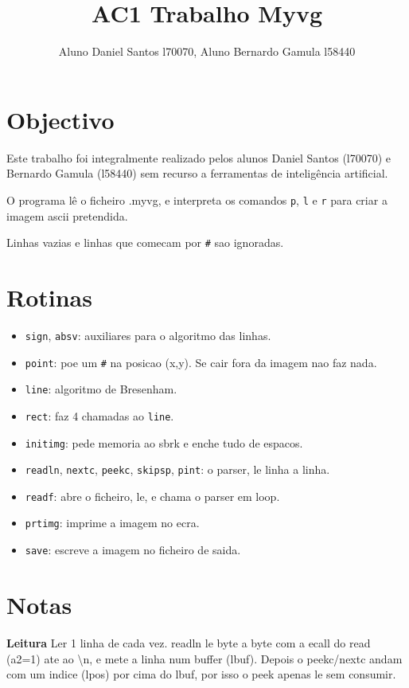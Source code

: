 \documentclass[11pt,a4paper]{article}
\title{AC1 Trabalho Myvg}
\author{Aluno Daniel Santos l70070, Aluno Bernardo Gamula l58440}
\date{}
\begin{document}
\maketitle

\section{Objectivo}

Este trabalho foi integralmente realizado pelos alunos Daniel Santos (l70070) e Bernardo Gamula (l58440) sem recurso a ferramentas de inteligência artificial.

O programa lê o ficheiro .myvg, e interpreta os comandos \texttt{p}, \texttt{l} e \texttt{r} para criar a imagem ascii pretendida.

Linhas vazias e linhas que comecam por \texttt{\#} sao ignoradas.

\section{Rotinas}

\begin{itemize}
\item \texttt{sign}, \texttt{absv}: auxiliares para o algoritmo das linhas.
\item \texttt{point}: poe um \texttt{\#} na posicao (x,y). Se cair fora da imagem nao faz nada.
\item \texttt{line}: algoritmo de Bresenham.
\item \texttt{rect}: faz 4 chamadas ao \texttt{line}.
\item \texttt{initimg}: pede memoria ao sbrk e enche tudo de espacos.
\item \texttt{readln}, \texttt{nextc}, \texttt{peekc}, \texttt{skipsp}, \texttt{pint}: o parser, le linha a linha.
\item \texttt{readf}: abre o ficheiro, le, e chama o parser em loop.
\item \texttt{prtimg}: imprime a imagem no ecra.
\item \texttt{save}: escreve a imagem no ficheiro de saida.
\end{itemize}

\section{Notas}

\textbf{Leitura}
Ler 1 linha de cada vez.
readln le byte a byte com a ecall do read (a2=1) ate ao \textbackslash{}n, e mete a linha num buffer (lbuf).
Depois o peekc/nextc andam com um indice (lpos) por cima do lbuf, por isso o peek apenas le sem consumir.
\end{document}
